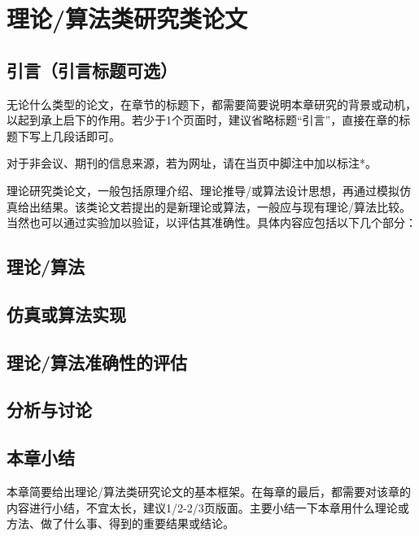 \chapter{理论/算法类研究类论文}
\label{cha:fourthsection}



\section{引言（引言标题可选）}
\label{sec:parameters}
无论什么类型的论文，在章节的标题下，都需要简要说明本章研究的背景或动机，以起到承上启下的作用。若少于1个页面时，建议省略标题“引言”，直接在章的标题下写上几段话即可。

对于非会议、期刊的信息来源，若为网址，请在当页中脚注中加以标注*。

理论研究类论文，一般包括原理介绍、理论推导/或算法设计思想，再通过模拟仿真给出结果。该类论文若提出的是新理论或算法，一般应与现有理论/算法比较。当然也可以通过实验加以验证，以评估其准确性。具体内容应包括以下几个部分：

\section{理论/算法}

\section{仿真或算法实现}

\section{理论/算法准确性的评估}

\section{分析与讨论}

\section{本章小结}
本章简要给出理论/算法类研究论文的基本框架。在每章的最后，都需要对该章的内容进行小结，不宜太长，建议1/2-2/3页版面。主要小结一下本章用什么理论或方法、做了什么事、得到的重要结果或结论。

